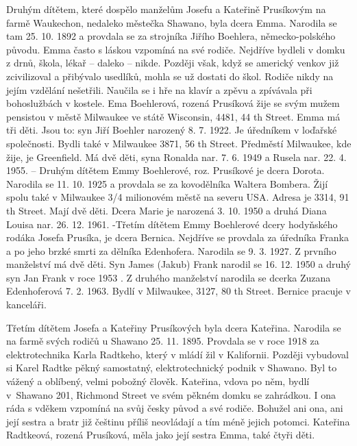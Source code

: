 \documentclass[../dejiny-rodu-prusiku.tex]{subfiles}
\begin{document}
Druhým dítětem, které dospělo manželům Josefu a Kateřině Prusíkovým na farmě Waukechon, nedaleko městečka Shawano, byla dcera Emma. Narodila se tam 25. 10. 1892 a provdala se za strojníka Jiřího Boehlera, německo-polského původu. Emma často s láskou vzpomíná na své rodiče. Nejdříve bydleli v domku z drnů, škola, lékař – daleko – nikde. Později však, když se americký venkov již zcivilizoval a přibývalo usedlíků, mohla se už dostati do škol. Rodiče nikdy na jejím vzdělání nešetřili. Naučila se i hře na klavír
a zpěvu a zpívávala při bohoslužbách v kostele. Ema Boehlerová, rozená Prusíková žije se svým mužem pensistou v městě Milwaukee ve státě Wisconsin, 4481, 44 th Street. Emma má tři děti. Jsou to: syn Jiří Boehler narozený 8. 7. 1922. Je úředníkem v loďařské společnosti. Bydli také v Milwaukee 3871, 56 th Street. Předměstí Milwaukee, kde žije, je Greenfield. Má dvě děti, syna Ronalda nar. 7. 6. 1949 a Rusela nar. 22. 4. 1955. – Druhým dítětem Emmy Boehlerové, roz. Prusíkové je dcera Dorota. Narodila se 11. 10. 1925 a provdala se za kovodělníka Waltera Bombera. Žijí spolu také v Milwaukee 3/4 milionovém městě na severu USA. Adresa je 3314, 91 th Street. Mají dvě děti. Dcera Marie je narozená 3. 10. 1950 a dru­há Diana Louisa nar. 26. 12. 1961. -Třetím dítětem Emmy Boehlerové dcery hodyňského rodáka Josefa Prusíka, je dcera Bernica. Nejdříve se provdala za úředníka Franka a po jeho brzké smrti za dělníka Edenhofera. Narodila se 9. 3. 1927. Z prvního manželství má dvě děti. Syn James (Jakub) Frank narodil se 16. 12. 1950 a druhý syn Jan Frank v roce 1953 . Z druhého manželství narodila se dcerka Zuzana Edenhoferová 7. 2. 1963. Bydlí v Milwaukee, 3127, 80 th Street. Bernice pracuje v kanceláři.

Třetím dítětem Josefa a Kateřiny Prusíkových byla dcera Kateřina. Narodila se na farmě svých rodičů u Shawano 25. 11. 1895. Provdala se v roce 1918 za elektrotechnika Karla Radtkeho, který v mládí žil v Kalifornii. Později vybudoval si Karel Radtke pěkný samostatný, elektrotechnický podnik v Shawano. Byl to vážený a oblíbený, velmi pobožný člověk. Kateřina, vdova po něm, bydlí v Shawano 201, Richmond Street ve svém pěkném domku se zahrádkou. I ona ráda s vděkem vzpomíná na svůj česky původ a své rodiče. Bohužel ani ona, ani její sestra a bratr již češtinu příliš neovládají a tím méně jejich potomci. Kateřina Radtkeová, rozená Prusíková, měla jako její sestra Emma, také čtyři děti.
\end{document}

